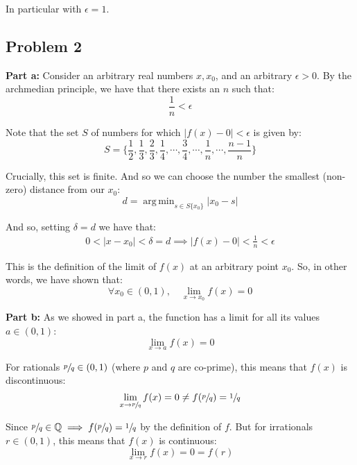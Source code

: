 \documentclass{article}
\newcommand{\R}{\mathbb R}
\newcommand{\Q}{\mathbb Q}
\DeclareMathOperator*{\argmin}{arg\,min}
\begin{document}
In particular with $\epsilon=1$.

\subsection*{Problem 2}
\noindent\textbf{Part a:} Consider an arbitrary real numbers $x,x_0$, and an arbitrary $\epsilon>0$. By the archmedian principle, we have that there exists an $n$ such that:
$$\frac{1}{n}<\epsilon$$

Note that the set $S$ of numbers for which $|f(x)-0|<\epsilon$ is given by:
$$S=\{\frac{1}{2},\frac{1}{3},\frac{2}{3},\frac{1}{4},\cdots,\frac{3}{4},\cdots,\frac{1}{n},\cdots,\frac{n-1}{n}\}$$

Crucially, this set is finite. And so we can choose the number the smallest (non-zero) distance from our $x_0$:
$$d=\argmin_{s\in S\{x_0\}}|x_0-s|$$

And so, setting $\delta=d$ we have that:
\begin{align*}
  0<|x-x_0|<\delta=d\implies |f(x)-0|<\frac{1}{n}<\epsilon
\end{align*}

This is the definition of the limit of $f(x)$ at an arbitrary point $x_0$. So, in other words, we have shown that:
$$\forall x_0\in(0,1),\quad \lim_{x\to x_0}f(x)=0$$




\bigskip

\noindent\textbf{Part b:} As we showed in part a, the function has a limit for all its values $a\in(0,1)$:
$$\lim_{x\to a}f(x)=0$$

For rationals $\sfrac{p}{q}\in(0,1)$ (where $p$ and $q$ are co-prime), this means that $f(x)$ is discontinuous:
$$\lim_{x\to \sfrac{p}{q}}f(x)=0\not=f(\sfrac{p}{q})=\sfrac{1}{q}$$

Since $\sfrac{p}{q}\in\Q\implies f(\sfrac{p}{q})=\sfrac{1}{q}$ by the definition of $f$. But for irrationals $r\in(0,1)$, this means that $f(x)$ is continuous:
$$\lim_{x\to r}f(x)=0=f(r)$$
\end{document}
